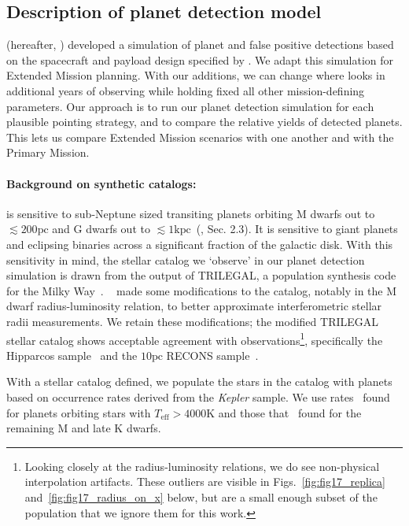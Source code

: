 \subsection{Description of planet detection model}
\label{sec:planet_detection_model}

\citet{Sullivan_2015} (hereafter, )
developed a simulation of \tesss planet and false positive detections
based on the spacecraft and payload design specified by
\citet{ricker_transiting_2014}.  We adapt this simulation for Extended
Mission planning.  With our additions, we can change where \tess looks
in additional years of observing while holding fixed all other
mission-defining parameters.  Our approach is to run our planet
detection simulation for each plausible pointing strategy, and to
compare the relative yields of detected planets.  This lets us compare
Extended Mission scenarios with one another and with the Primary
Mission.

\paragraph{Background on synthetic catalogs:}

\tess is sensitive to sub-Neptune sized transiting planets orbiting M
dwarfs out to $\lesssim200\text{pc}$ and G dwarfs out to
$\lesssim1\text{kpc}$~(, Sec. 2.3).  It is
sensitive to giant planets and eclipsing binaries across a significant
fraction of the galactic disk.  With this sensitivity in mind, the
stellar catalog we `observe' in our planet detection simulation is
drawn from the output of TRILEGAL, a population synthesis code for the
Milky Way~\citep{girardi_star_2005}.  ~ made
some modifications to the catalog, notably in the M dwarf
radius-luminosity relation, to better approximate interferometric
stellar radii measurements.  We retain these modifications; the modified
TRILEGAL stellar catalog shows acceptable agreement with
observations\footnote{Looking closely at the radius-luminosity
  relations, we do see non-physical interpolation artifacts. These
  outliers are visible in Figs.~\ref{fig:fig17_replica}
  and~\ref{fig:fig17_radius_on_x} below, but are a small enough subset
  of the population that we ignore them for this work.}, specifically
the Hipparcos
sample~\citep{perryman_hipparcos_1997,van_leeuwen_validation_2007} and
the $10\text{pc}$ RECONS sample~\citep{henry_solar_2006}.

With a stellar catalog defined, we populate the stars in the catalog
with planets based on occurrence rates derived from the
\textit{Kepler} sample.  We use rates~\citet{fressin_false_2013} found
for planets orbiting stars with $T_\text{eff} > 4000\text{K}$ and
those that~\citet{dressing_occurrence_2015} found for the remaining M
and late K dwarfs.

